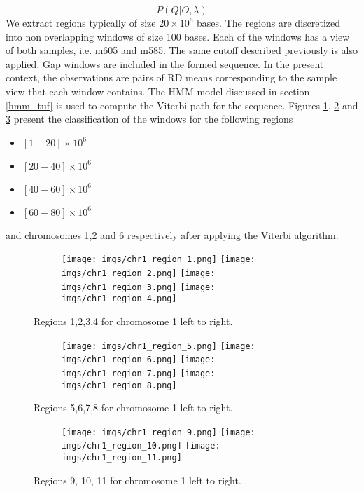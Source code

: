 \begin{equation}
P(Q|O, \lambda)
\end{equation}
We extract regions typically of size $20\times 10^6$ bases. The regions are 
discretized into non overlapping  windows of size 100 bases. Each of the windows has a view of both samples, i.e. m605 and m585. 
The same cutoff described previously is also applied. Gap windows are included in the formed sequence. In the present context, the observations are pairs of RD means corresponding to the sample view that each window contains. The HMM model discussed in section \ref{hmm_tuf} is used to
compute the Viterbi path for the sequence. Figures \ref{fig:image1}, \ref{fig:image2} and \ref{fig:image3} present the classification of the windows for the following regions

\begin{itemize}
	\item $[1-20]\times 10^6$
	\item $[20-40]\times 10^6$
	\item $[40-60]\times 10^6$
	\item $[60-80]\times 10^6$
\end{itemize} 
and chromosomes 1,2 and 6 respectively after applying the Viterbi algorithm.

\begin{figure}[h]
	\begin{subfigure}{}
		\texttt{[image: imgs/chr1\_region\_1.png]}
		\texttt{[image: imgs/chr1\_region\_2.png]}
		\texttt{[image: imgs/chr1\_region\_3.png]}
		\texttt{[image: imgs/chr1\_region\_4.png]}	
	\end{subfigure}

	\caption{Regions 1,2,3,4  for chromosome 1 left to right.  }
	\label{fig:image1}
\end{figure}

\begin{figure}[h]
	\begin{subfigure}{}
		\texttt{[image: imgs/chr1\_region\_5.png]}
		\texttt{[image: imgs/chr1\_region\_6.png]}
		\texttt{[image: imgs/chr1\_region\_7.png]}
		\texttt{[image: imgs/chr1\_region\_8.png]}	
	\end{subfigure}
	
	\caption{Regions 5,6,7,8  for chromosome 1 left to right.  }
	\label{fig:image2}
\end{figure}

\begin{figure}[h]
	\begin{subfigure}{}
		\texttt{[image: imgs/chr1\_region\_9.png]}
		\texttt{[image: imgs/chr1\_region\_10.png]}
		\texttt{[image: imgs/chr1\_region\_11.png]}	
	\end{subfigure}
	
	\caption{Regions 9, 10, 11  for chromosome 1 left to right.  }
	\label{fig:image3}
\end{figure}


